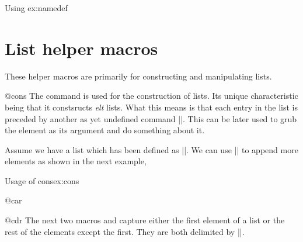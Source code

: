 \begin{texexample}{Using \string\@namedef}{ex:namedef}
\makeatletter
{}
\makeatother
\end{texexample}

\section{List helper macros}

These helper macros are primarily for constructing and manipulating lists. 

\begin{docCommand}{@cons} {}
The command \cmd{\@cons} is used for the construction of lists. Its unique
characteristic being that it constsructs \emph{elt} lists. What this means is that each entry in the list is
preceded by another as yet undefined command |\@elt|. This can be later used to grub the element as
its argument and do something about it.
\end{docCommand}

\begin{teX}
\def\@cons#1#2{\begingroup\let\@elt\relax\xdef#1{#1\@elt #2}\endgroup}
\end{teX}


Assume we have a list \cmd{\mylist} which has been defined as ||.
We can use |\@cons| to append more elements as shown in the next example,

\begin{texexample}{Usage of cons}{ex:cons}
\makeatletter
\def\mylist{}
\@cons\mylist{one}
\@cons\mylist{two}
\def\@elt{\space}
\mylist
\makeatother
\end{texexample}


\begin{docCommand}{@car}{}
\end{docCommand}
\begin{docCommand}{@cdr}{}
The next two macros \cmd{\@car} and \cmd{\@cdr} capture either the first element of a list or the rest of the elements
except the first. They are both delimited by |\@nil|.
\end{docCommand}




